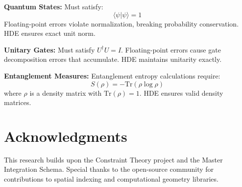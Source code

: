 \documentclass{article}
\begin{document}
\textbf{Quantum States:} Must satisfy:
\begin{equation}
\langle\psi|\psi\rangle = 1
\end{equation}
Floating-point errors violate normalization, breaking probability conservation. HDE ensures exact unit norm.

\textbf{Unitary Gates:} Must satisfy $U^\dagger U = I$. Floating-point errors cause gate decomposition errors that accumulate. HDE maintains unitarity exactly.

\textbf{Entanglement Measures:} Entanglement entropy calculations require:
\begin{equation}
S(\rho) = -\text{Tr}(\rho \log \rho)
\end{equation}
where $\rho$ is a density matrix with $\text{Tr}(\rho) = 1$. HDE ensures valid density matrices.

\section*{Acknowledgments}

This research builds upon the Constraint Theory project and the Master Integration Schema. Special thanks to the open-source community for contributions to spatial indexing and computational geometry libraries.



\end{document}
